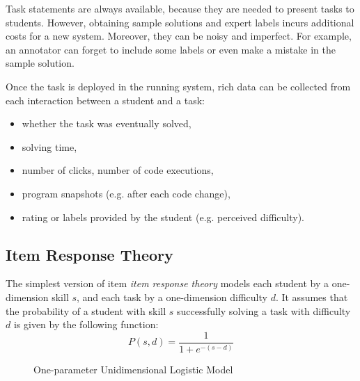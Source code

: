 Task statements are always available,
  because they are needed to present tasks to students.
However, obtaining sample solutions and expert labels
  incurs additional costs for a new system.
Moreover, they can be noisy and imperfect.
For example, an annotator can forget to include some labels
  or even make a mistake in the sample solution.

Once the task is deployed in the running system,
  rich data can be collected from each interaction between a student and a task:
\begin{itemize}
  \item whether the task was eventually solved,
  \item solving time,
  \item number of clicks, number of code executions,
  \item program snapshots (e.g. after each code change),
  \item rating or labels provided by the student (e.g. perceived difficulty).
\end{itemize}


\subsection{Item Response Theory}
\label{sec:irt}

The simplest version of item \emph{item response theory} \cite{irt-visual-guide}
  models each student by a one-dimension skill $s$,
  and each task by a one-dimension difficulty $d$.
It assumes that the probability of a student with skill $s$
  successfully solving a task with difficulty $d$
  is given by the following function:
  \begin{equation}\label{eq:logistic}
  P(s, d) = \frac{1}{1 + e^{-(s - d)}}
  \end{equation}

\begin{figure}[h]
  \centering
  \caption{One-parameter Unidimensional Logistic Model}
  \label{fig:logistic-model}
\end{figure}

